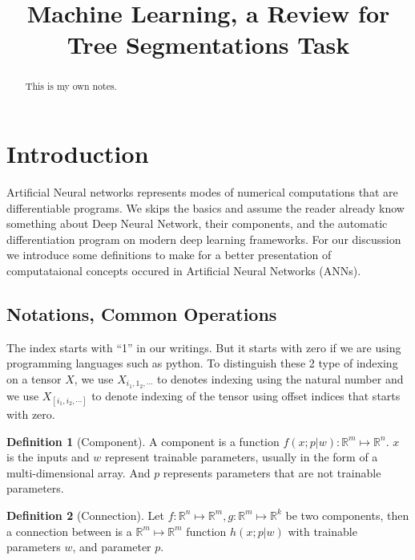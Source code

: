 \documentclass[]{article}
\title{Machine Learning, a Review for Tree Segmentations Task}
\author{}
\theoremstyle{definition}
\newtheorem{definition}{Definition}
\numberwithin{equation}{subsection}
\begin{document}
\maketitle

\begin{abstract}
    This is my own notes. 
\end{abstract}

\tableofcontents

\section{Introduction}
    Artificial Neural networks represents modes of numerical computations that are differentiable programs. 
    We skips the basics and assume the reader already know something about Deep Neural Network, their components, and the automatic differentiation program on modern deep learning frameworks. 
    For our discussion we introduce some definitions to make for a better presentation of computataional concepts occured in Artificial Neural Networks (ANNs). 
    \par
    \subsection{Notations, Common Operations}
        The index starts with ``1'' in our writings. 
        But it starts with zero if we are using programming languages such as python. 
        To distinguish these 2 type of indexing on a tensor $X$, we use $X_{i_1, 1_2, \cdots}$ to denotes indexing using the natural number and we use $X_{[i_1, i_2, \cdots]}$ to denote indexing of the tensor using offset indices that starts with zero. 
    \begin{definition}[Component]
        A component is a function $f(x; p|w): \mathbb R^m \mapsto \mathbb R^n$. 
        $x$ is the inputs and $w$ represent trainable parameters, usually in the form of a multi-dimensional array. 
        And $p$ represents parameters that are not trainable parameters. 
        
    \end{definition}
    \begin{definition}[Connection]
        Let $f:\mathbb R^n \mapsto \mathbb R^m, g: \mathbb R^m \mapsto \mathbb R^k$ be two components, then a connection between is a $\mathbb R^m \mapsto \mathbb R^m$ function $h(x; p | w)$ with trainable parameters $w$, and parameter $p$. 
    \end{definition}
\end{document}
